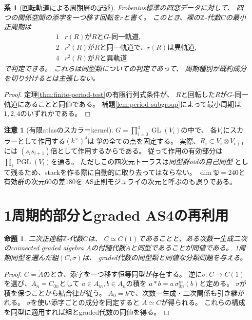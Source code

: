 \documentclass[11pt,a4paper]{ltjsarticle}
\newtheorem{proposition}[theorem]{命題}
\newtheorem{corollary}[theorem]{系}
\theoremstyle{definition}
\newtheorem{remark}[theorem]{注意}
\newcommand{\ZZ}{\mathbb Z}
\newcommand{\GL}{\operatorname{GL}}
\newcommand{\PGL}{\operatorname{PGL}}
\begin{document}
\begin{corollary}[回転軌道による周期層の記述]\label{cor:period-orbits}
Frobenius標準の四窓データに対して、
四つの関係空間の添字を一つ移す回転を$r$と書く。
このとき、裸の$\ZZ$-代数$C$の最小正周期は
\[
 \begin{array}{c|l}
 1& r(R)\text{が}R\text{と}G\text{-同一軌道},\\
 2& r^2(R)\text{が}R\text{と同一軌道で、}r(R)\text{は異軌道},\\
 4& r^2(R)\text{が}R\text{と異軌道}
 \end{array}
\]
で判定できる。
これらは同型類についての判定であって、
周期種別が既約成分を切り分けるとは主張しない。
\end{corollary}
\begin{proof}
定理\ref{thm:finite-period-test}の有限行列式条件が、
$R$と回転した$R$が$G$-同一軌道にあることと同値である。
補題\ref{lem:period-subgroup}によって最小周期は
$1,2,4$のいずれかである。
\end{proof}

\begin{remark}[有限atlasのスカラーkernel]
$G=\prod_{i=0}^{3}\GL(V_i)$の中で、
各$V_i$にスカラーとして作用する$(k^\times)^4$は
$\mathfrak P$の全ての点を固定する。
実際、$R_i\subset V_i\otimes V_{i+1}$には
$(s_i s_{i+1})$倍として作用するからである。
従って作用の有効部分は$\prod_i\PGL(V_i)$を通る。
ただしこの四次元トーラスは\emph{同型群oidの自己同型}
として残るため、stackを作る際に自動的に取り去ってはならない。
$\dim\mathfrak P=240$と有効群の次元60の差180を
AS正則モジュライの次元と呼ぶのも誤りである。
\end{remark}

\section{1周期的部分とgraded AS4の再利用}
\begin{proposition}\label{prop:graded-period}
二次正連結$\ZZ$-代数$C$は、
$C\simeq C(1)$であることと、ある次数一生成二次のconnected
graded algebra $A$の付随代数$\check A$と同型であることが同値である。
1周期同型を\emph{選んだ組}$(C,\sigma)$は、
graded代数の同型類と同値な分類問題を与える。
\end{proposition}
\begin{proof}
$C=\check A$のとき、添字を一つ移す恒等同型が存在する。
逆に$\sigma:C\to C(1)$を選び、$A_n=C_{0n}$として
$a\in A_m,b\in A_n$の積を
$a*b=a\,\sigma^m_{0n}(b)$と定める。
$\sigma$が積を保つことから結合律が従う。
$A_0=k$で、次数一生成・二次関係も引き継がれる。
$\sigma$を使い添字ごとの成分を同定すると
$\check A\simeq C$が得られる。
これらの構成を同型に適用すれば組とgraded代数の同値を得る。
\end{proof}
\end{document}

